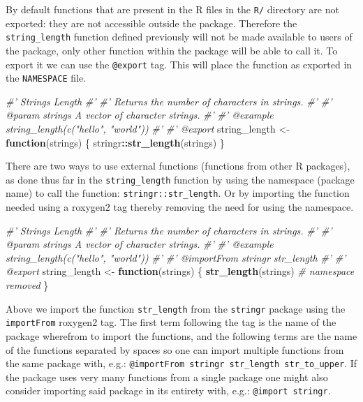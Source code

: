 \documentclass[10pt,]{krantz}
\makeatletter
\newenvironment{Shaded}{\begin{snugshade}}{\end{snugshade}}
\newcommand{\CommentTok}[1]{\textcolor[rgb]{0.37,0.37,0.37}{\textit{#1}}}
\newcommand{\ControlFlowTok}[1]{\textcolor[rgb]{0.27,0.27,0.27}{\textbf{#1}}}
\newcommand{\KeywordTok}[1]{\textcolor[rgb]{0.27,0.27,0.27}{\textbf{#1}}}
\newcommand{\NormalTok}[1]{#1}
\newcommand{\OperatorTok}[1]{\textcolor[rgb]{0.43,0.43,0.43}{\textbf{#1}}}
\newcommand{\StringTok}[1]{\textcolor[rgb]{0.5,0.5,0.5}{#1}}
\newenvironment{kframe}{%
\medskip{}
\setlength{\fboxsep}{.8em}
 \def\at@end@of@kframe{}%
 \ifinner\ifhmode%
  \def\at@end@of@kframe{\end{minipage}}%
  \begin{minipage}{\columnwidth}%
 \fi\fi%
 \def\FrameCommand##1{\hskip\@totalleftmargin \hskip-\fboxsep
 \colorbox{shadecolor}{##1}\hskip-\fboxsep
     \hskip-\linewidth \hskip-\@totalleftmargin \hskip\columnwidth}%
 \MakeFramed {\advance\hsize-\width
   \@totalleftmargin\z@ \linewidth\hsize
   \@setminipage}}%
 {\par\unskip\endMakeFramed%
 \at@end@of@kframe}
\renewenvironment{Shaded}{\begin{kframe}}{\end{kframe}}
\makeatother
\begin{document}
By default functions that are present in the R files in the \texttt{R/} directory are not exported: they are not accessible outside the package. Therefore the \texttt{string\_length} function defined previously will not be made available to users of the package, only other function within the package will be able to call it. To export it we can use the \texttt{@export} tag. This will place the function as exported in the \texttt{NAMESPACE} file.

\begin{Shaded}
\begin{Highlighting}[]
\CommentTok{#' Strings Length}
\CommentTok{#' }
\CommentTok{#' Returns the number of characters in strings. }
\CommentTok{#' }
\CommentTok{#' @param strings A vector of character strings.}
\CommentTok{#' }
\CommentTok{#' @example string_length(c("hello", "world"))}
\CommentTok{#' }
\CommentTok{#' @export}
\NormalTok{string_length <-}\StringTok{ }\ControlFlowTok{function}\NormalTok{(strings) \{}
\NormalTok{  stringr}\OperatorTok{::}\KeywordTok{str_length}\NormalTok{(strings)}
\NormalTok{\}}
\end{Highlighting}
\end{Shaded}

There are two ways to use external functions (functions from other R packages), as done thus far in the \texttt{string\_length} function by using the namespace (package name) to call the function: \texttt{stringr::str\_length}. Or by importing the function needed using a roxygen2 tag thereby removing the need for using the namespace.

\begin{Shaded}
\begin{Highlighting}[]
\CommentTok{#' Strings Length}
\CommentTok{#' }
\CommentTok{#' Returns the number of characters in strings. }
\CommentTok{#' }
\CommentTok{#' @param strings A vector of character strings.}
\CommentTok{#' }
\CommentTok{#' @example string_length(c("hello", "world"))}
\CommentTok{#' }
\CommentTok{#' @importFrom stringr str_length}
\CommentTok{#' }
\CommentTok{#' @export}
\NormalTok{string_length <-}\StringTok{ }\ControlFlowTok{function}\NormalTok{(strings) \{}
  \KeywordTok{str_length}\NormalTok{(strings) }\CommentTok{# namespace removed}
\NormalTok{\}}
\end{Highlighting}
\end{Shaded}

Above we import the function \texttt{str\_length} from the \texttt{stringr} package using the \texttt{importFrom} roxygen2 tag. The first term following the tag is the name of the package wherefrom to import the functions, and the following terms are the name of the functions separated by spaces so one can import multiple functions from the same package with, e.g.: \texttt{@importFrom\ stringr\ str\_length\ str\_to\_upper}. If the package uses very many functions from a single package one might also consider importing said package in its entirety with, e.g.: \texttt{@import\ stringr}.
\end{document}
